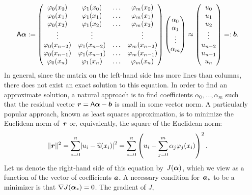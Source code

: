 \[
    \mathsf A \mathbf{\boldsymbol{\alpha}} :=
    \begin{pmatrix}
        \varphi_0(x_0) & \varphi_1(x_0) & \hdots & \varphi_m(x_0) \\
        \varphi_0(x_1) & \varphi_1(x_1) & \hdots & \varphi_m(x_1) \\
        \varphi_0(x_2) & \varphi_1(x_2) & \hdots & \varphi_m(x_2) \\
        \vdots & \vdots & & \vdots \\
        \varphi_0(x_{n-2}) & \varphi_1(x_{n-2}) & \hdots & \varphi_m(x_{n-2}) \\
        \varphi_0(x_{n-1}) & \varphi_1(x_{n-1}) & \hdots & \varphi_m(x_{n-1}) \\
        \varphi_0(x_n) & \varphi_1(x_n) & \hdots & \varphi_m(x_n)
    \end{pmatrix}
    \begin{pmatrix}
        \alpha_0 \\
        \alpha_1 \\
        \vdots \\
        \alpha_m
    \end{pmatrix}
    \approx
    \begin{pmatrix}
        u_0 \\
        u_1 \\
        u_2 \\
        \vdots \\
        u_{n-2} \\
        u_{n-1} \\
        u_n
    \end{pmatrix} =: \mathbf{\boldsymbol{b}}.
\]
In general,
since the matrix on the left-hand side has more lines than columns,
there does not exist an exact solution to this equation.
In order to find an approximate solution,
a natural approach is to find coefficients $\alpha_0, \dotsc, \alpha_m$ such that
the residual vector $\mathbf{\boldsymbol{r}} = \mathsf A \mathbf{\boldsymbol{\alpha}} - \mathbf{\boldsymbol{b}}$ is small in some vector norm.
A particularly popular approach,
known as least squares approximation,
is to minimize the Euclidean norm of~$\mathbf{\boldsymbol{r}}$ or,
equivalently, the square of the Euclidean norm:
\[
    \norm{\vect r}^2 = \sum_{i=0}^{n} \abs[big]{u_i - \widehat u(x_i)}^2 = \sum_{i=0}^{n} \left( u_i - \sum_{j=0}^{m} \alpha_j \varphi_j(x_i) \right)^2.
\]
Let us denote the right-hand side of this equation by~$J(\mathbf{\boldsymbol{\alpha}})$,
which we view as a function of the vector of coefficients $\mathbf{\boldsymbol{a}}$.
A necessary condition for~$\mathbf{\boldsymbol{a}}_*$ to be a minimizer is that $\nabla J(\mathbf{\boldsymbol{\alpha}}_*) = 0$.
The gradient of $J$,
